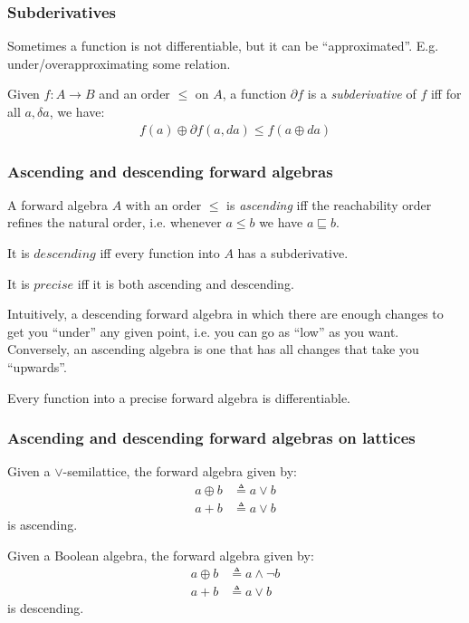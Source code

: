 \documentclass[english]{beamer}
\theoremstyle{plain}
\theoremstyle{remark}
\theoremstyle{remark}
\theoremstyle{remark}
\theoremstyle{definition}
\theoremstyle{definition}
\newcommand{\ra}[0]{\rightarrow}
\newcommand{\defeq}[0]{\triangleq}
\newcommand{\rleq}[0]{\sqsubseteq}
\begin{document}
\begin{frame}
  \frametitle{Subderivatives}
  Sometimes a function is not differentiable, but it can be ``approximated''.
  \vfill
  E.g. under/overapproximating some relation.
  \vfill
  \begin{definition}[subderivative]
    Given $f : A \ra B$ and an order $\leq$ on $A$, a function $\partial f$ is a
    \textit{subderivative} of $f$ iff for all $a, \delta a$, we have:
    \begin{align*}
      f(a) \oplus \partial f(a, da) \leq f(a \oplus da)
    \end{align*}
  \end{definition}
\end{frame}

\begin{frame}
  \frametitle{Ascending and descending forward algebras}
  \begin{definition}
    A forward algebra $A$ with an order $\leq$ is \textit{ascending} iff the reachability
    order refines the natural order, i.e. whenever $a \leq b$ we have $a \rleq b$.

    It is $\textit{descending}$ iff every function into $A$ has a subderivative.

    It is $\textit{precise}$ iff it is both ascending and descending.
  \end{definition}
  \vfill

  Intuitively, a descending forward algebra in which there are enough changes to get you
  ``under'' any given point, i.e. you can go as ``low'' as you want. Conversely, an ascending
  algebra is one that has all changes that take you ``upwards''.
  \vfill
  \begin{lemma}
    Every function into a precise forward algebra is differentiable.
  \end{lemma}
\end{frame}

\begin{frame}
  \frametitle{Ascending and descending forward algebras on lattices}
  \begin{lemma}
    Given a $\vee$-semilattice, the forward algebra given by:
    \begin{align*}
      a \oplus b &\defeq a \vee b\\
      a + b &\defeq a \vee b
    \end{align*}
    is ascending.
  \end{lemma}
  \begin{lemma}
    Given a Boolean algebra, the forward algebra given by:
    \begin{align*}
      a \oplus b &\defeq a \wedge \neg b\\
      a + b &\defeq a \vee b
    \end{align*}
    is descending.
  \end{lemma}
\end{frame}
\end{document}
